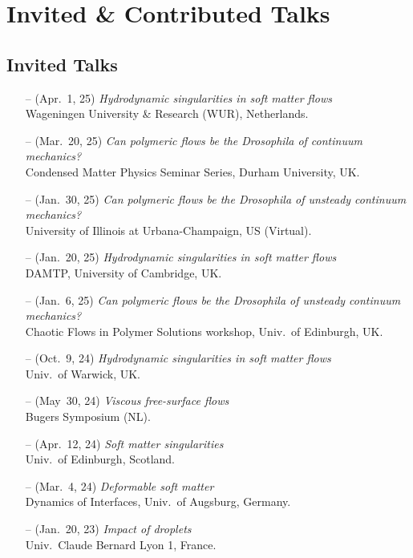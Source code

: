 \documentclass[10pt,a4paper,colorlinks,linkcolor=blue,urlcolor=blue,citecolor=blue]{moderncv}
\begin{document}
\section{Invited \& Contributed Talks}

\subsection{Invited Talks}
\begin{itemize}[leftmargin=1.25em]
\item[--] (Apr.~1, 25) \emph{Hydrodynamic singularities in soft matter flows} \\
  Wageningen University \& Research (WUR), Netherlands.
\item[--] (Mar.~20, 25) \emph{Can polymeric flows be the Drosophila of continuum mechanics?} \\
  Condensed Matter Physics Seminar Series, Durham University, UK.
\item[--] (Jan.~30, 25) \emph{Can polymeric flows be the Drosophila of unsteady continuum mechanics?} \\
  University of Illinois at Urbana-Champaign, US (Virtual).
\item[--] (Jan.~20, 25) \emph{Hydrodynamic singularities in soft matter flows} \\
  DAMTP, University of Cambridge, UK.
\item[--] (Jan.~6, 25) \emph{Can polymeric flows be the Drosophila of unsteady continuum mechanics?}\\
  Chaotic Flows in Polymer Solutions workshop, Univ.~of Edinburgh, UK.
\item[--] (Oct.~9, 24) \emph{Hydrodynamic singularities in soft matter flows} \\
  Univ.~of Warwick, UK.
\item[--] (May~30, 24) \emph{Viscous free-surface flows} \\
  Bugers Symposium (NL).
\item[--] (Apr.~12, 24) \emph{Soft matter singularities} \\
  Univ.~of Edinburgh, Scotland.
\item[--] (Mar.~4, 24) \emph{Deformable soft matter} \\
  Dynamics of Interfaces, Univ.~of Augsburg, Germany.
\item[--] (Jan.~20, 23) \emph{Impact of droplets} \\
  Univ.~Claude Bernard Lyon 1, France.

\end{itemize}
\end{document}
